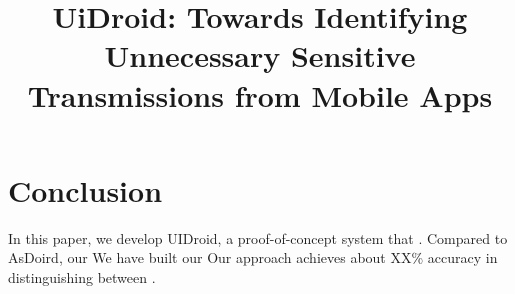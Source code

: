 \documentclass[10pt, conference, letterpaper]{IEEEtran}
\newcommand{\ignore}[1]{}
\begin{document}
\title{UiDroid: Towards Identifying Unnecessary Sensitive Transmissions from Mobile Apps}

\maketitle


\begin{abstract}

\ignore{
When users interact with an app, users directly read the content of user interfaces, which gives an intuitive idea of the functionality including the security-related information of the app.
To best assist the end users, the user interface should explicitly reflect the underline behaviors of the app.
In this paper, we present a system UIDroid to detect unintended stealthy behaviors by identifying inconsistence between UI and program behaviors.
UIDroid outperforms previous work AsDroid in the following aspects:
\begin{itemize}
\item Unlike AsDroid limits itself to four types of sensitive communication, UIDroid considers all sensitive API calls, which reflects more behaviors;
\item AsDroid only cares about certain buttons and treat them independently, we extend the target by introducing window layout.
\item UIDroid takes temporal relationships into consideration. In specific, a sensitive behaviors may triggered by a sequences of interactions (DroidSIFT) and a widget may lead to different behaviors under distinguish contexts (PEG);
\item Single event handler may conceal multiple sensitive API calls;
\item The static analysis results help to build models used to monitor dynamic runtime behaviors.
\end{itemize}
Evaluation using open sourced apps and malware dataset
}


\end{abstract}







\section{Conclusion}\label{sec:conclusion}
In this paper, we develop UIDroid, a proof-of-concept system that .
Compared to AsDoird, our
We have built our
Our approach achieves about XX\% accuracy in distinguishing between .


%
\end{document}
